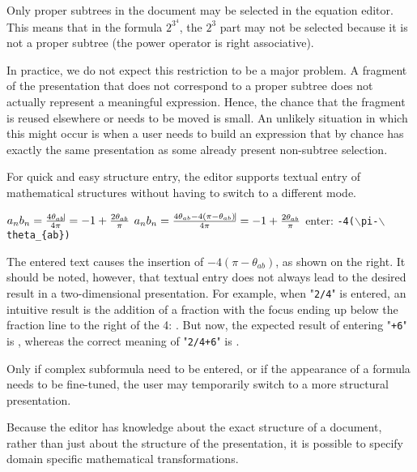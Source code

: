 Only proper subtrees in the document may be selected in the equation editor. This means that in the formula $2^{3^4}$, 
the $2^3$ part may not be selected because it is not a proper subtree (the power operator is right associative). 

In practice, we do not expect this restriction to be a major problem. A fragment of the presentation that does not correspond to a proper subtree does not actually represent a meaningful expression. Hence, the chance that the fragment is reused elsewhere or needs to be moved is small. An unlikely situation in which this might occur is when a user needs to build an expression that by chance has exactly the same presentation as some already present non-subtree selection.


For quick and easy structure entry, the editor supports textual entry of mathematical structures without having to switch to a different mode.

\editScreenshot
{$a_nb_n = \frac{4\theta_{ab}\vline}{4\pi } = -1 + \frac{2\theta_{ab}}{\pi}$}
{$a_nb_n = \frac{4\theta_{ab} - 4(\pi - \theta_{ab})\vline}{4\pi } = -1 + \frac{2\theta_{ab}}{\pi}$}
{enter:  {\tt -4($\backslash$pi-$\backslash$theta\_\{ab\})}}{}

The entered text causes the insertion of $- 4(\pi - \theta_{ab})$, as shown on the right.  It should be noted, however, that textual entry does not always lead to the desired result in a two-dimensional presentation. For example, when "\verb|2/4|" is entered, an intuitive result is the addition of a fraction with the focus ending up below the fraction line to the right of the 4: . But now, the expected result of entering "\verb|+6|" is , whereas the correct meaning of "\verb|2/4+6|" is .

Only if complex subformula need to be entered, or if the appearance of a formula needs to be fine-tuned, the user may temporarily switch to a more structural presentation. 


Because the editor has knowledge about the exact structure of a document, rather than just about the structure of the presentation, it is possible to specify domain specific mathematical transformations.

